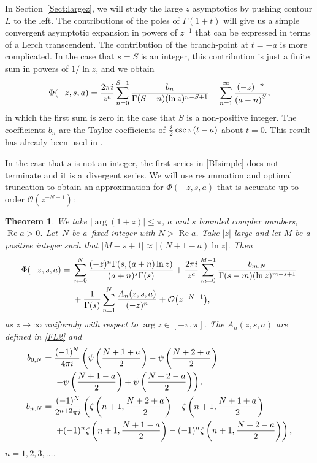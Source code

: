 \documentclass[11pt]{article}
\numberwithin{equation}{section}
\numberwithin{equation}{section}
\def\iunit{{\rm i}}
\def\bigO{{\mathcal O}}
\newtheorem{theorem}{Theorem} %
\begin{document}
In Section~\ref{Sect:largez}, we will study the large $z$ asymptotics by pushing contour $L$ to the left.
The contributions of the poles of $\Gamma(1+t)$ will give us a simple convergent asymptotic
expansion in powers of $z^{-1}$ that can be expressed in terms of a Lerch transcendent.
The contribution of the branch-point at $t=-a$ is more complicated. In the case that $s=S$ is an integer,
this contribution is just a finite sum in powers of $1/\ln z$, and we obtain
\begin{gather}\label{BIsimple}
 \Phi(-z,s,a)=\frac{2\pi\iunit}{z^{a}}\sum_{n=0}^{S-1}
 \frac{b_n}{\Gamma(S-n)(\ln z)^{n-S+1}}
 -\sum_{n=1}^\infty\frac{(-z)^{-n}}{\left(a-n\right)^S},
\end{gather}
in which the first sum is zero in the case that $S$ is a non-positive integer. The coefficients
$b_n$ are the Taylor coefficients of $\frac{\iunit}2 \csc \pi(t-a)$ about $t=0$.
This result has already been used in \cite[Lemma 3]{NCA2023}.

In the case that $s$ is not an integer, the first series in \eqref{BIsimple} does not terminate
and it is a~divergent series. We will use resummation and optimal truncation to obtain
an approximation for $\Phi(-z,s,a)$ that is accurate up to order
$\bigO\left(z^{-{N-1}}\right)$:

\begin{theorem}\label{thm1}
 We take $|\arg(1+z)|\leq \pi$, $a$ and $s$ bounded complex numbers,
 $\operatorname{Re} a>0$. Let~$N$ be a~fixed integer with $N>\operatorname{Re} a$. Take $|z|$ large and let $M$
 be a positive integer such that $|M-s+1|\approx |(N+1-a)\ln z|$. Then
 \begin{align*}%
 \Phi(-z,s,a)={}& \sum_{n=0}^N \frac{(-z)^n \Gamma(s,(a+n)\ln z)}{(a+n)^s\Gamma(s)}
 +\frac{2\pi\iunit}{z^{a}}\sum_{m=0}^{M-1}
 \frac{b_{m,N}}{\Gamma(s-m)(\ln z)^{m-s+1}}\\
 & +\frac1{\Gamma(s)}\sum_{n=1}^N \frac{A_n(z,s,a)}{%
 (-z)^n}+\bigO\bigl(z^{-N-1}\bigr),
\end{align*}
as $z\to\infty$ uniformly with respect to $\arg z\in[-\pi,\pi]$.
The $A_n(z,s,a)$ are defined in \eqref{FL2} and
\begin{align}
 b_{0,N}={}&\frac{(-1)^N}{4\pi\iunit}\left(\psi\left(\frac{N+1+a}2\right)
 -\psi\left(\frac{N+2+a}2\right)\right.\nonumber\\
 &\left.-\psi\left(\frac{N+1-a}2\right)
 +\psi\left(\frac{N+2-a}2\right)\right),\nonumber\\
 b_{n,N}={}&\frac{(-1)^{N}}{2^{n+2}\pi\iunit}\left(\zeta\left(n+1,\frac{N+2+a}2\right)
 -\zeta\left(n+1,\frac{N+1+a}2\right)\right.\nonumber\\
 &\left.+(-1)^n\zeta\left(n+1,\frac{N+1-a}2\right)
 -(-1)^n\zeta\left(n+1,\frac{N+2-a}2\right)\right),\label{BnN2}
\end{align}
$n=1,2,3,\ldots$.
\end{theorem}
\end{document}
